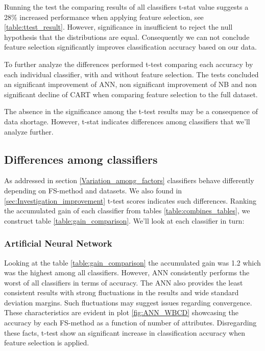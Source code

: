 

Running the test the comparing results of all classifiers t-stat value suggests a 28\% increased performance when applying feature selection, see \ref{table:ttest_result}. However, significance in insufficient to reject the null hypothesis that the distributions are equal. Consequently we can not conclude feature selection significantly improves classification accuracy based on our data.

To further analyze the differences performed t-test comparing each accuracy by each individual classifier, with and without feature selection. The tests concluded an significant improvement of ANN, non significant improvement of NB and non significant decline of CART when comparing feature selection to the full dataset.



The absence in the significance among the t-test results may be a consequence of data shortage. However, t-stat indicates differences among classifiers that we'll analyze further.


\subsection{Differences among classifiers}

As addressed in section \ref{Variation_among_factors} classifiers behave differently depending on FS-method and datasets. We also found in \ref{sec:Investigation_improvement} t-test scores indicates such differences. Ranking the accumulated gain of each classifier from tables \ref{table:combines_tables}, we construct table \ref{table:gain_comparison}. We'll look at each classifier in turn:

\begin{table}[hp]
  
  \caption[]%
  {{\small Ranking of which classifiers gained most accuracy when comparing feature selection to full dataset.}}
  \label{table:gain_comparison}
\end{table}

\subsubsection{Artificial Neural Network}

Looking at the table \ref{table:gain_comparison} the accumulated gain was 1.2 which was the highest among all classifiers. However, ANN consistently performs the worst of all classifiers in terms of accuracy. The ANN also provides the least consistent results with strong fluctuations in the results and wide standard deviation margins. Such fluctuations may suggest issues regarding convergence. These characteristics are evident in plot \ref{fig:ANN_WBCD} showcasing the accuracy by each FS-method as a function of number of attributes. Disregarding these facts, t-test show an significant increase in classification accuracy when feature selection is applied.

